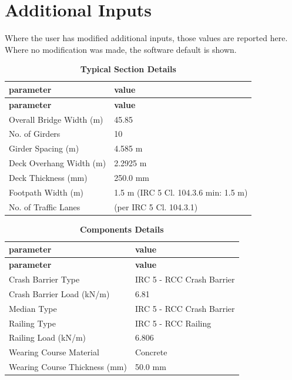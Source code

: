 \documentclass[12pt,a4paper]{report}
\numberwithin{table}{chapter}
\numberwithin{figure}{chapter}
\newcommand{\ReportTableRowGap}{6pt}
\begin{document}
\newpage
\section{Additional Inputs}
\label{sec:additional-inputs}

Where the user has modified additional inputs, those values are reported here. Where no modification was made, the software default is shown.

\vspace{0.8cm}

\begin{longtable}{|L{5.5cm}|p{10.0cm}|}
\caption{\textbf{Typical Section Details}}\\
\hline
\textbf{parameter} & \textbf{value} \\
\hline
\endfirsthead
\hline
\textbf{parameter} & \textbf{value} \\
\hline
\endhead

\textnormal{Overall Bridge Width (m)} & 45.85 \\[\ReportTableRowGap]
\hline
\textnormal{No. of Girders} & 10 \\[\ReportTableRowGap]
\hline
\textnormal{Girder Spacing (m)} & 4.585 m \\[\ReportTableRowGap]
\hline
\textnormal{Deck Overhang Width (m)} & 2.2925 m \\[\ReportTableRowGap]
\hline
\textnormal{Deck Thickness (mm)} & 250.0 mm \\[\ReportTableRowGap]
\hline
\textnormal{Footpath Width (m)} & 1.5 m (IRC 5 Cl. 104.3.6 min: 1.5 m) \\[\ReportTableRowGap]
\hline
\textnormal{No. of Traffic Lanes} &  (per IRC 5 Cl. 104.3.1) \\[\ReportTableRowGap]
\hline
\end{longtable}

\vspace{0.8em}

\begin{longtable}{|L{5.5cm}|p{10.0cm}|}
\caption{\textbf{Components Details}}\\
\hline
\textbf{parameter} & \textbf{value} \\
\hline
\endfirsthead
\hline
\textbf{parameter} & \textbf{value} \\
\hline
\endhead

\textnormal{Crash Barrier Type} & IRC 5 - RCC Crash Barrier \\[\ReportTableRowGap]
\hline
\textnormal{Crash Barrier Load (kN/m)} & 6.81 \\[\ReportTableRowGap]
\hline
\textnormal{Median Type} & IRC 5 - RCC Crash Barrier \\[\ReportTableRowGap]
\hline

\textnormal{Railing Type} & IRC 5 - RCC Railing \\[\ReportTableRowGap]
\hline
\textnormal{Railing Load (kN/m)} & 6.806 \\[\ReportTableRowGap]
\hline
\textnormal{Wearing Course Material} & Concrete \\[\ReportTableRowGap]
\hline
\textnormal{Wearing Course Thickness (mm)} & 50.0 mm \\[\ReportTableRowGap]
\hline
\end{longtable}
\end{document}
